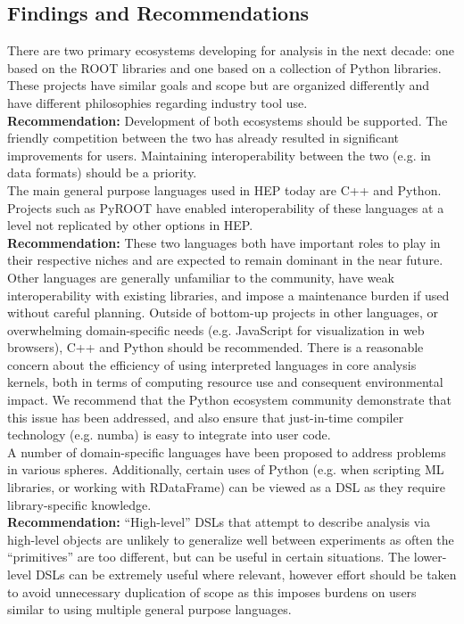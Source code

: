 \subsection{Findings and Recommendations}
There are two primary ecosystems developing for analysis in the next decade: one based on the ROOT libraries and one based on a collection of Python libraries. These projects have similar goals and scope but are organized differently and have different philosophies regarding industry tool use.\\
\textbf{Recommendation:} Development of both ecosystems should be supported. The friendly competition between the two has already resulted in significant improvements for users. Maintaining interoperability between the two (e.g. in data formats) should be a priority.\\

The main general purpose languages used in HEP today are C++ and Python. Projects such as PyROOT have enabled interoperability of these languages at a level not replicated by other options in HEP.\\
\textbf{Recommendation:} These two languages both have important roles to play in their respective niches and are expected to remain dominant in the near future. Other languages are generally unfamiliar to the community, have weak interoperability with existing libraries, and impose a maintenance burden if used without careful planning. Outside of bottom-up projects in other languages, or overwhelming domain-specific needs (e.g. JavaScript for visualization in web browsers), C++ and Python should be recommended. There is a reasonable concern about the efficiency of using interpreted languages in core analysis kernels, both in terms of computing resource use and consequent environmental impact. We recommend that the Python ecosystem community demonstrate that this issue has been addressed, and also ensure that just-in-time compiler technology (e.g. numba) is easy to integrate into user code.\\

A number of domain-specific languages have been proposed to address problems in various spheres. Additionally, certain uses of Python (e.g. when scripting ML libraries, or working with RDataFrame) can be viewed as a DSL as they require library-specific knowledge.\\
\textbf{Recommendation:} ``High-level'' DSLs that attempt to describe analysis via high-level objects are unlikely to generalize well between experiments as often the ``primitives'' are too different, but can be useful in certain situations. The lower-level DSLs can be extremely useful where relevant, however effort should be taken to avoid unnecessary duplication of scope as this imposes burdens on users similar to using multiple general purpose languages.\\

